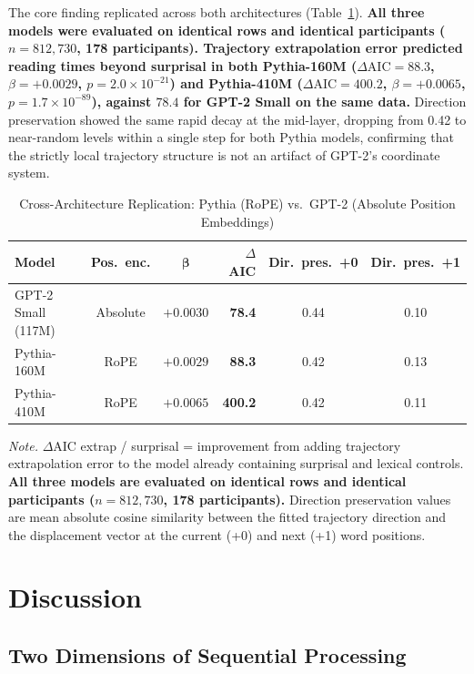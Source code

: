 \documentclass[12pt]{article}
\newcommand{\new}[1]{{\bfseries #1}}
\begin{document}
The core finding replicated across both architectures (Table~\ref{tab:crossarch}). \new{All three models were evaluated on identical rows and identical participants ($n = 812{,}730$, 178 participants). Trajectory extrapolation error predicted reading times beyond surprisal in both Pythia-160M ($\Delta\text{AIC} = 88.3$, $\beta = +0.0029$, $p = 2.0 \times 10^{-21}$) and Pythia-410M ($\Delta\text{AIC} = 400.2$, $\beta = +0.0065$, $p = 1.7 \times 10^{-89}$), against $78.4$ for GPT-2 Small on the same data.} Direction preservation showed the same rapid decay at the mid-layer, dropping from 0.42 to near-random levels within a single step for both Pythia models, confirming that the strictly local trajectory structure is not an artifact of GPT-2's coordinate system.

\begin{table}[!htbp]
\centering
\caption{Cross-Architecture Replication: Pythia (RoPE) vs.\ GPT-2 (Absolute Position Embeddings)}
\label{tab:crossarch}
\begin{tabular}{lccrcc}
\toprule
\textbf{Model} & \textbf{Pos.\ enc.} & \new{$\boldsymbol{\beta}$} & \textbf{$\Delta$AIC} & \textbf{Dir.\ pres.\ +0} & \textbf{Dir.\ pres.\ +1} \\
\midrule
GPT-2 Small (117M) & Absolute & \new{$+0.0030$} & \new{78.4} & 0.44 & 0.10 \\
Pythia-160M & RoPE & \new{$+0.0029$} & \new{88.3} & 0.42 & 0.13 \\
Pythia-410M & RoPE & \new{$+0.0065$} & \new{400.2} & 0.42 & 0.11 \\
\bottomrule
\end{tabular}

\smallskip
\footnotesize
\textit{Note.} $\Delta$AIC extrap / surprisal = improvement from adding trajectory extrapolation error to the model already containing surprisal and lexical controls. \new{All three models are evaluated on identical rows and identical participants ($n = 812{,}730$, 178 participants).} Direction preservation values are mean absolute cosine similarity between the fitted trajectory direction and the displacement vector at the current (+0) and next (+1) word positions.
\end{table}

\FloatBarrier

\section{Discussion}

\subsection{Two Dimensions of Sequential Processing}
\end{document}
